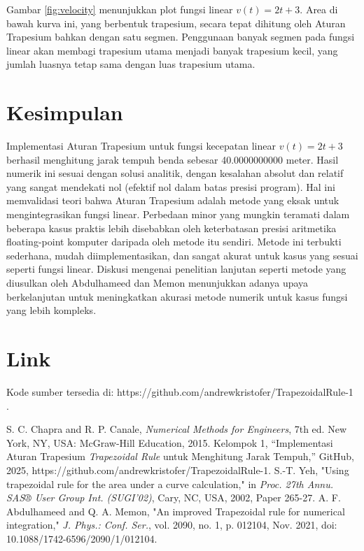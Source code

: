 \documentclass[conference]{IEEEtran}
\begin{document}
Gambar \ref{fig:velocity} menunjukkan plot fungsi linear \( v(t) = 2t + 3 \). Area di bawah kurva ini, yang berbentuk trapesium, secara tepat dihitung oleh Aturan Trapesium bahkan dengan satu segmen. Penggunaan banyak segmen pada fungsi linear akan membagi trapesium utama menjadi banyak trapesium kecil, yang jumlah luasnya tetap sama dengan luas trapesium utama.

\section{Kesimpulan}
Implementasi Aturan Trapesium untuk fungsi kecepatan linear \(v(t) = 2t+3\) berhasil menghitung jarak tempuh benda sebesar 40.0000000000 meter. Hasil numerik ini sesuai dengan solusi analitik, dengan kesalahan absolut dan relatif yang sangat mendekati nol (efektif nol dalam batas presisi program). Hal ini memvalidasi teori bahwa Aturan Trapesium adalah metode yang eksak untuk mengintegrasikan fungsi linear. Perbedaan minor yang mungkin teramati dalam beberapa kasus praktis lebih disebabkan oleh keterbatasan presisi aritmetika floating-point komputer daripada oleh metode itu sendiri. Metode ini terbukti sederhana, mudah diimplementasikan, dan sangat akurat untuk kasus yang sesuai seperti fungsi linear. Diskusi mengenai penelitian lanjutan seperti metode yang diusulkan oleh Abdulhameed dan Memon \cite{b_abdulhameed} menunjukkan adanya upaya berkelanjutan untuk meningkatkan akurasi metode numerik untuk kasus fungsi yang lebih kompleks.

\section{Link}
Kode sumber tersedia di: https://github.com/andrewkristofer/TrapezoidalRule-1 \cite{b2}.

\begin{thebibliography}{00}
 S. C. Chapra and R. P. Canale, \textit{Numerical Methods for Engineers}, 7th ed. New York, NY, USA: McGraw-Hill Education, 2015.
 Kelompok 1, ``Implementasi Aturan Trapesium \textit{Trapezoidal Rule} untuk Menghitung Jarak Tempuh,'' GitHub, 2025, https://github.com/andrewkristofer/TrapezoidalRule-1. %
 S.-T. Yeh, "Using trapezoidal rule for the area under a curve calculation," in \textit{Proc. 27th Annu. SAS® User Group Int. (SUGI’02)}, Cary, NC, USA, 2002, Paper 265-27.
 A. F. Abdulhameed and Q. A. Memon, "An improved Trapezoidal rule for numerical integration," \textit{J. Phys.: Conf. Ser.}, vol. 2090, no. 1, p. 012104, Nov. 2021, doi: 10.1088/1742-6596/2090/1/012104.
\end{thebibliography}
\end{document}
